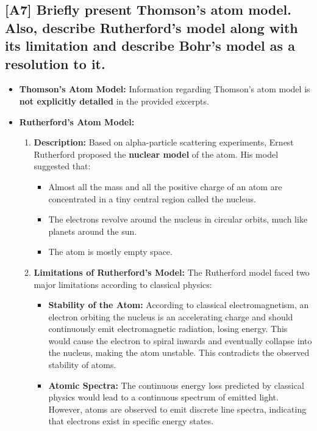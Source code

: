 \documentclass[12pt]{article}
\begin{document}
\subsection{[A7] Briefly present Thomson's atom model. Also, describe Rutherford's model along with its limitation and describe Bohr's model as a resolution to it.}

\begin{itemize}
    \item \textbf{Thomson's Atom Model:} Information regarding Thomson's atom model is \textbf{not explicitly detailed} in the provided excerpts.
    \item \textbf{Rutherford's Atom Model:}
    \begin{enumerate}[label=\alph*.]
        \item \textbf{Description:} Based on alpha-particle scattering experiments, Ernest Rutherford proposed the \textbf{nuclear model} of the atom. His model suggested that:
        \begin{itemize}
            \item Almost all the mass and all the positive charge of an atom are concentrated in a tiny central region called the nucleus.
            \item The electrons revolve around the nucleus in circular orbits, much like planets around the sun.
            \item The atom is mostly empty space.
        \end{itemize}
        \item \textbf{Limitations of Rutherford's Model:} The Rutherford model faced two major limitations according to classical physics:
        \begin{itemize}
            \item \textbf{Stability of the Atom:} According to classical electromagnetism, an electron orbiting the nucleus is an accelerating charge and should continuously emit electromagnetic radiation, losing energy. This would cause the electron to spiral inwards and eventually collapse into the nucleus, making the atom unstable. This contradicts the observed stability of atoms.
            \item \textbf{Atomic Spectra:} The continuous energy loss predicted by classical physics would lead to a continuous spectrum of emitted light. However, atoms are observed to emit discrete line spectra, indicating that electrons exist in specific energy states.
        \end{itemize}
    \end{enumerate}

\end{itemize}
\end{document}
